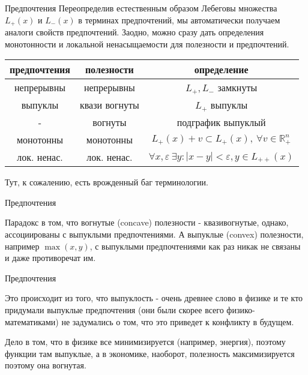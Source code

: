 \documentclass{beamer}
\begin{document}
\begin{frame}{Предпочтения}
Переопределив естественным образом Лебеговы множества $L_{+}(x)$ и $L_{-}(x)$ в терминах предпочтений, мы автоматически получаем аналоги свойств предпочтений. Заодно, можно сразу дать определения монотонности и локальной ненасыщаемости для полезности и предпочтений.
\vspace*{-0.5cm}
\begin{table}
\begin{center}
\begin{tabular}{@{} |c|c|c| @{}}
 \hline
 предпочтения & полезности & определение \\ 
 \hline
 непрерывны & непрерывны & $L_+, L_-$ замкнуты \\ 
 \alert{выпуклы} & квази вогнуты & $L_+$ выпуклы \\ 
 - & вогнуты & подграфик выпуклый \\ 
 монотонны & монотонны & $L_{+}(x) + v \subset L_+(x), \ \forall v \in \mathbb{R}^n_+$\\
лок. ненас. & лок. ненас. & $\forall x,\varepsilon \ \exists y: |x-y|<\varepsilon, y \in L_{++}(x)$\\
 \hline
\end{tabular}
\end{center}
\end{table}

Тут, к сожалению, есть врожденный баг терминологии.
\end{frame}

\begin{frame}{Предпочтения}

Парадокс в том, что вогнутые (concave) полезности - квазивогнутые, однако, ассоциированы с выпуклыми предпочтениями. А выпуклые (convex) полезности, например $\max(x,y)$, с выпуклыми предпочтениями как раз никак не связаны и даже противоречат им. 

\end{frame}

\begin{frame}{Предпочтения}

Это происходит из того, что выпуклость - очень древнее слово в физике и те кто придумали выпуклые предпочтения (они были скорее всего физико-математиками) не задумались о том, что это приведет к конфликту в будущем.

Дело в том, что в физике все минимизируется (например, энергия), поэтому функции там выпуклые, а в экономике, наоборот, полезность максимизируется поэтому она вогнутая.

\end{frame}
\end{document}
